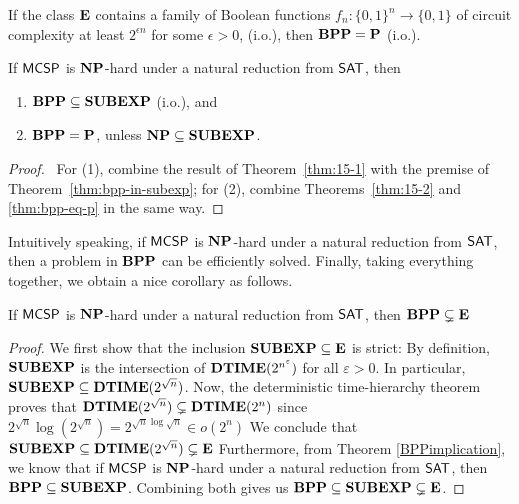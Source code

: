 \documentclass[11pt]{article}
\begin{document}
\begin{theorem}
  \label{thm:bpp-eq-p}
	If the class $\mathbf{E}$ contains a family of Boolean functions $f_n: \{0, 1\}^n \rightarrow \{0, 1\}$ of circuit complexity at least $2^{\epsilon n}$ for some $\epsilon > 0$, (i.o.), then $\mathbf{BPP} = \mathbf{P}$ (i.o.).
\end{theorem}

\begin{theorem}[\cite{10.1145/335305.335314}]
	\label{BPPimplication}
	If $\mathsf{MCSP}$ is $\mathbf{NP}$-hard under a natural reduction from $\mathsf{SAT}$, then
	\begin{enumerate} [1.]
		\item $\mathbf{BPP} \subseteq \mathbf{SUBEXP}$ (i.o.), and
		\item $\mathbf{BPP} = \mathbf{P}$, unless $\mathbf{NP} \subseteq \mathbf{SUBEXP}$.
	\end{enumerate}
\end{theorem}

\begin{proof} \
  For (1), combine the result of Theorem~\ref{thm:15-1} with the premise of
  Theorem~\ref{thm:bpp-in-subexp};
  for (2), combine Theorems~\ref{thm:15-2} and \ref{thm:bpp-eq-p} in the same
  way.
\end{proof}

Intuitively speaking, if $\mathsf{MCSP}$ is $\mathbf{NP}$-hard under a natural reduction from $\mathsf{SAT}$, then a problem in $\mathbf{BPP}$ can be efficiently solved. Finally, taking everything together, we obtain a nice corollary as follows.

\begin{corollary}
	If $\mathsf{MCSP}$ is $\mathbf{NP}$-hard under a natural reduction from $\mathsf{SAT}$, then $\mathbf{BPP} \subsetneq \mathbf{E}$
\end{corollary}

\begin{proof}
  We first show that the inclusion $\mathbf{SUBEXP} \subseteq \mathbf{E}$ is
  strict:
  By definition, $\mathbf{SUBEXP}$ is the intersection of
  $\mathbf{DTIME}(2^{n^\varepsilon})$ for all $\varepsilon > 0$.
  In particular, $\mathbf{SUBEXP} \subseteq \mathbf{DTIME}(2^{\sqrt n})$.
  Now, the deterministic time-hierarchy theorem proves that
  $\mathbf{DTIME}(2^{\sqrt n}) \subsetneq \mathbf{DTIME}(2^{n})$ since
  $2^{\sqrt n} \log(2^{\sqrt n}) = 2^{\sqrt n \log \sqrt n}
   \in o(2^n)$
  We conclude that
  $\mathbf{SUBEXP} \subseteq \mathbf{DTIME}(2^{\sqrt n}) \subsetneq \mathbf{E}$
  Furthermore, from Theorem \ref{BPPimplication}, we know that if
  $\mathsf{MCSP}$ is
  $\mathbf{NP}$-hard under a natural reduction from $\mathsf{SAT}$, then
  $\mathbf{BPP} \subseteq \mathbf{SUBEXP}$.
  Combining both gives us
  $\mathbf{BPP} \subseteq \mathbf{SUBEXP} \subsetneq \mathbf{E}$.
\end{proof}
\end{document}
